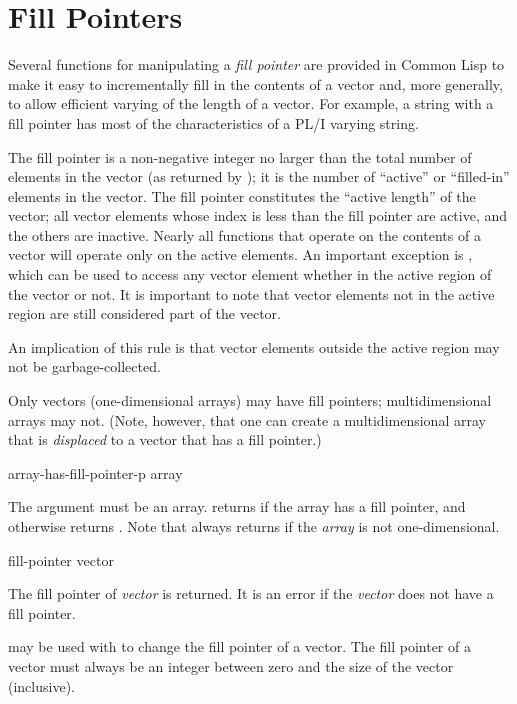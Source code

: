\section{Fill Pointers}
\label{FILL-POINTER}

Several functions for manipulating a {\it fill pointer} are provided
in Common Lisp
to make it easy to incrementally fill in the contents of a vector
and, more generally, to allow efficient varying of the length of a vector.
For example, a string with a fill pointer has most of the characteristics
of a PL/I varying string.

The fill pointer is a non-negative integer no larger than the total
number of elements in the vector (as returned by );
it is the number of ``active'' or ``filled-in'' elements in the vector.
The fill pointer constitutes the ``active length'' of the vector;
all vector elements whose index is less than the fill pointer are
active, and the others are inactive.
Nearly all functions that operate on the contents of a vector
will operate only on the active elements.  An important exception
is , which can be used to access any vector element
whether in the active region of the vector or not.  It is important
to note that vector elements not in the active region are still considered
part of the vector.

\beforenoterule
\begin{implementation}
An implication of this rule is that
vector elements outside the active region may not be garbage-collected.
\end{implementation}
\afternoterule

Only vectors (one-dimensional arrays) may have fill pointers;
multidimensional arrays may not.  (Note, however, that one can create
a multidimensional array that is {\it displaced} to a vector that has
a fill pointer.)

\begin{defun}[Function]
array-has-fill-pointer-p array

The argument must be an array.   returns
{\true} if the array has a fill pointer, and otherwise returns {\false}.
Note that
always returns {\false} if
the {\it array} is not one-dimensional.
\end{defun}

\begin{defun}[Function]
fill-pointer vector

The fill pointer of {\it vector} is returned.  It is an error if
the {\it vector} does not have a fill pointer.

 may be used with  to change the fill pointer
of a vector.  The fill pointer of a vector must always be an integer
between zero and the size of the vector (inclusive).
\end{defun}

